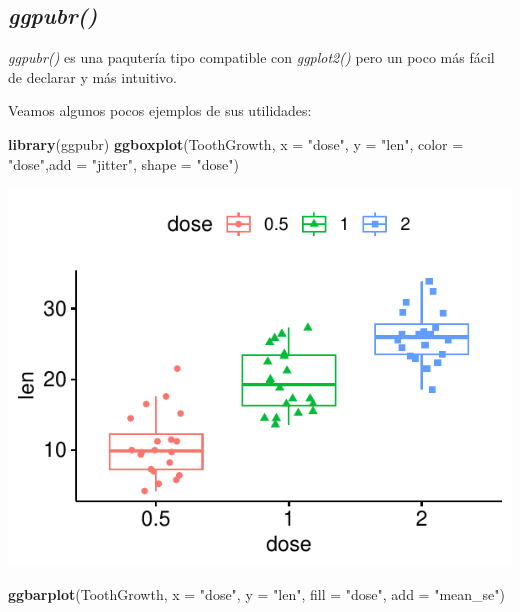 \documentclass[
]{book}
\newenvironment{Shaded}{\begin{snugshade}}{\end{snugshade}}
\newcommand{\AttributeTok}[1]{\textcolor[rgb]{0.13,0.29,0.53}{#1}}
\newcommand{\FunctionTok}[1]{\textcolor[rgb]{0.13,0.29,0.53}{\textbf{#1}}}
\newcommand{\NormalTok}[1]{#1}
\newcommand{\StringTok}[1]{\textcolor[rgb]{0.31,0.60,0.02}{#1}}
\begin{document}
\subsection{\texorpdfstring{\emph{ggpubr()}}{ggpubr()}}\label{ggpubr}

\emph{ggpubr()} es una paqutería tipo compatible con \emph{ggplot2()} pero un poco más fácil de declarar y más intuitivo.

Veamos algunos pocos ejemplos de sus utilidades:

\begin{Shaded}
\begin{Highlighting}[]
\FunctionTok{library}\NormalTok{(ggpubr)}
\FunctionTok{ggboxplot}\NormalTok{(ToothGrowth, }\AttributeTok{x =} \StringTok{"dose"}\NormalTok{, }\AttributeTok{y =} \StringTok{"len"}\NormalTok{, }\AttributeTok{color =} \StringTok{"dose"}\NormalTok{,}\AttributeTok{add =} \StringTok{"jitter"}\NormalTok{, }\AttributeTok{shape =} \StringTok{"dose"}\NormalTok{)}
\end{Highlighting}
\end{Shaded}

\begin{center}\includegraphics{R_Manual_files/figure-latex/unnamed-chunk-226-1} \end{center}

\begin{Shaded}
\begin{Highlighting}[]
\FunctionTok{ggbarplot}\NormalTok{(ToothGrowth, }\AttributeTok{x =} \StringTok{"dose"}\NormalTok{, }\AttributeTok{y =} \StringTok{"len"}\NormalTok{, }\AttributeTok{fill =} \StringTok{"dose"}\NormalTok{, }\AttributeTok{add =} \StringTok{"mean\_se"}\NormalTok{)}
\end{Highlighting}
\end{Shaded}
\end{document}
